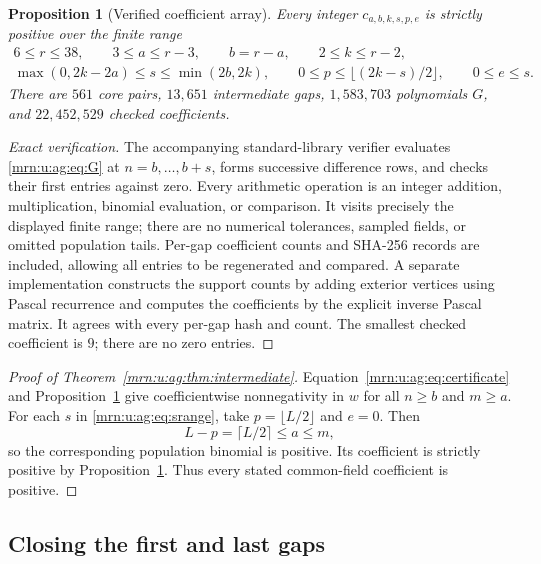 \documentclass[11pt,a4paper]{article}
\newtheorem{proposition}[theorem]{Proposition}
\theoremstyle{remark}\newtheorem{remark}[theorem]{Remark}
\begin{document}
\begin{proposition}[Verified coefficient array]\label{mrn:u:ag:prop:array}
Every integer $c_{a,b,k,s,p,e}$ is strictly positive over the finite range
\[
 \begin{gathered}
 6\le r\le38,\qquad 3\le a\le r-3,\qquad b=r-a,\qquad
 2\le k\le r-2,\\
 \max(0,2k-2a)\le s\le\min(2b,2k),\qquad
 0\le p\le\lfloor(2k-s)/2\rfloor,\qquad 0\le e\le s.
 \end{gathered}
\]
There are $561$ core pairs, $13{,}651$ intermediate gaps, $1{,}583{,}703$ polynomials $G$, and $22{,}452{,}529$ checked coefficients.
\end{proposition}
\begin{proof}[Exact verification]
The accompanying standard-library verifier evaluates \eqref{mrn:u:ag:eq:G} at $n=b,\ldots,b+s$, forms successive difference rows, and checks their first entries against zero. Every arithmetic operation is an integer addition, multiplication, binomial evaluation, or comparison. It visits precisely the displayed finite range; there are no numerical tolerances, sampled fields, or omitted population tails. Per-gap coefficient counts and SHA-256 records are included, allowing all entries to be regenerated and compared. A separate implementation constructs the support counts by adding exterior vertices using Pascal recurrence and computes the coefficients by the explicit inverse Pascal matrix. It agrees with every per-gap hash and count. The smallest checked coefficient is $9$; there are no zero entries.
\end{proof}

\begin{proof}[Proof of Theorem~\ref{mrn:u:ag:thm:intermediate}]
Equation~\eqref{mrn:u:ag:eq:certificate} and Proposition~\ref{mrn:u:ag:prop:array} give coefficientwise nonnegativity in $w$ for all $n\ge b$ and $m\ge a$. For each $s$ in \eqref{mrn:u:ag:eq:srange}, take $p=\lfloor L/2\rfloor$ and $e=0$. Then
\[
 L-p=\lceil L/2\rceil\le a\le m,
\]
so the corresponding population binomial is positive. Its coefficient is strictly positive by Proposition~\ref{mrn:u:ag:prop:array}. Thus every stated common-field coefficient is positive.
\end{proof}

\subsection{Closing the first and last gaps}
\end{document}
